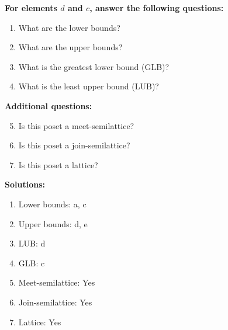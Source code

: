 \documentclass{article}
\begin{document}
    \textbf{For elements $d$ and $c$, answer the following questions:}
\begin{enumerate}
    \item What are the lower bounds?
    \item What are the upper bounds?
    \item What is the greatest lower bound (GLB)?
    \item What is the least upper bound (LUB)?
\end{enumerate}
    \hspace*{3ex} \textbf{Additional questions:}
\begin{enumerate}
    \setcounter{enumi}{4}
    \item Is this poset a meet-semilattice?
    \item Is this poset a join-semilattice?
    \item Is this poset a lattice?
\end{enumerate}

\textbf{Solutions:}
\begin{enumerate}
    \item Lower bounds: {a, c}
    \item Upper bounds: {d, e}
    \item LUB: d
    \item GLB: c
    \item Meet-semilattice: Yes
    \item Join-semilattice: Yes
    \item Lattice: Yes
\end{enumerate}
\newpage
\end{document}
